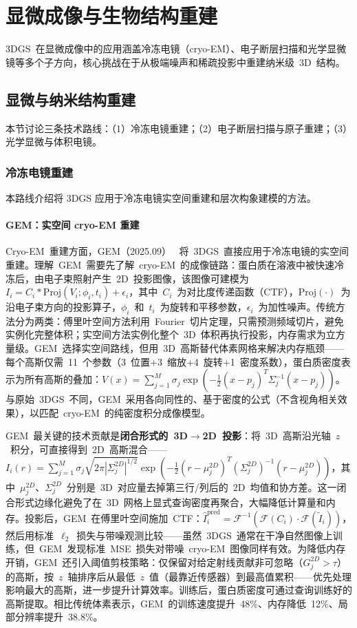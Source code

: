 \section{显微成像与生物结构重建}
\label{sec:19_3}

3DGS~在显微成像中的应用涵盖冷冻电镜（cryo-EM）、电子断层扫描和光学显微镜等多个子方向，核心挑战在于从极端噪声和稀疏投影中重建纳米级~3D~结构。

\subsection{显微与纳米结构重建}
\label{ss:19_6}

本节讨论三条技术路线：（1）冷冻电镜重建；（2）电子断层扫描与原子重建；（3）光学显微与体积电镜。

\subsubsection{冷冻电镜重建}

本路线介绍将 3DGS 应用于冷冻电镜实空间重建和层次构象建模的方法。

\paragraph{GEM：实空间 cryo-EM 重建}

Cryo-EM~重建方面，GEM（2025.09）~\cite{2509_25075} 将~3DGS~直接应用于冷冻电镜的实空间重建。理解~GEM~需要先了解~cryo-EM~的成像链路：蛋白质在溶液中被快速冷冻后，由电子束照射产生~2D~投影图像，该图像可建模为~$I_i = C_i * \text{Proj}(V_i; \phi_i, t_i) + \epsilon_i$，其中~$C_i$~为对比度传递函数（CTF），$\text{Proj}(\cdot)$~为沿电子束方向的投影算子，$\phi_i$~和~$t_i$~为旋转和平移参数，$\epsilon_i$~为加性噪声。传统方法分为两类：傅里叶空间方法利用~Fourier~切片定理，只需预测频域切片，避免实例化完整体积；实空间方法实例化整个~3D~体积再执行投影，内存需求为立方量级。GEM~选择实空间路线，但用~3D~高斯替代体素网格来解决内存瓶颈——每个高斯仅需~11~个参数（3~位置+3~缩放+4~旋转+1~密度系数），蛋白质密度表示为所有高斯的叠加：$V(x) = \sum_{j=1}^{M} \sigma_j \exp(-\frac{1}{2}(x-p_j)^T \Sigma_j^{-1}(x-p_j))$。与原始~3DGS~不同，GEM~采用各向同性的、基于密度的公式（不含视角相关效果），以匹配~cryo-EM~的纯密度积分成像模型。

GEM~最关键的技术贡献是\textbf{闭合形式的~3D$\to$2D~投影}：将~3D~高斯沿光轴~$z$~积分，可直接得到~2D~高斯混合——$I_i(r) = \sum_{j=1}^{M} \sigma_j \sqrt{2\pi|\Sigma_{j}^{2D}|^{1/2}} \exp(-\frac{1}{2}(r-\mu_j^{2D})^T (\Sigma_j^{2D})^{-1}(r-\mu_j^{2D}))$，其中~$\mu_j^{2D}$、$\Sigma_j^{2D}$~分别是~3D~对应量去掉第三行/列后的~2D~均值和协方差。这一闭合形式边缘化避免了在~3D~网格上显式查询密度再聚合，大幅降低计算量和内存。投影后，GEM~在傅里叶空间施加~CTF：$\hat{I}_i^{\text{pred}} = \mathcal{F}^{-1}(\mathcal{F}(C_i) \cdot \mathcal{F}(\tilde{I}_i))$，然后用标准~$\ell_2$~损失与带噪观测比较——虽然~3DGS~通常在干净自然图像上训练，但~GEM~发现标准~MSE~损失对带噪~cryo-EM~图像同样有效。为降低内存开销，GEM~还引入阈值剪枝策略：仅保留对给定射线贡献非可忽略（$G_j^{2D} > \tau$）的高斯，按~$z$~轴排序后从最低~$z$~值（最靠近传感器）到最高值累积——优先处理影响最大的高斯，进一步提升计算效率。训练后，蛋白质密度可通过查询训练好的高斯提取。相比传统体素表示，GEM~的训练速度提升~48\%、内存降低~12\%、局部分辨率提升~38.8\%。

